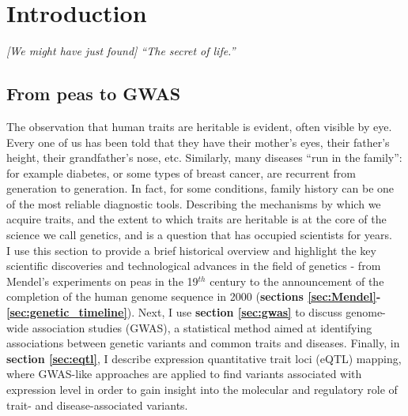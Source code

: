 
\chapter{Introduction}  %

\textit{[We might have just found] “The secret of life.”}\\

\section{From peas to GWAS}  %

The observation that human traits are heritable is evident, often visible by eye. 
Every one of us has been told that they have their mother’s eyes, their father’s height, their grandfather’s nose, etc. 
Similarly, many diseases “run in the family”: for example diabetes, or some types of breast cancer, are recurrent from generation to generation. 
In fact, for some conditions, family history can be one of the most reliable diagnostic tools. 
Describing the mechanisms by which we acquire traits, and the extent to which traits are heritable is at the core of the science we call genetics, and is a question that has occupied scientists for years.\\

I use this section to provide a brief historical overview and highlight the key scientific discoveries and technological advances in the field of genetics - from Mendel's experiments on peas in the 19$^{th}$ century to the announcement of the completion of the human genome sequence in 2000 (\textbf{sections \ref{sec:Mendel}-\ref{sec:genetic_timeline}}).
Next, I use \textbf{section \ref{sec:gwas}} to discuss genome-wide association studies (GWAS), a statistical method aimed at identifying associations between genetic variants and common traits and diseases.
Finally, in \textbf{section \ref{sec:eqtl}}, I describe expression quantitative trait loci (eQTL) mapping, where GWAS-like approaches are applied to find variants associated with expression level in order to gain insight into the molecular and regulatory role of trait- and disease-associated variants.

